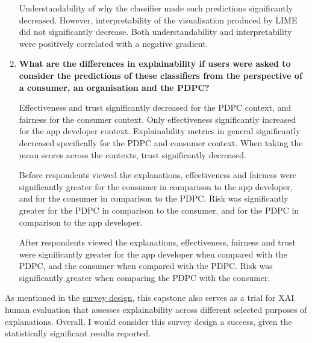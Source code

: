 \begin{enumerate}[listparindent=0.5cm]
    Understandability of why the classifier made such predictions significantly decreased. However, interpretability of the visualisation produced by LIME did not significantly decrease. Both understandability and interpretability were positively correlated with a negative gradient.

    \item \textbf{What are the differences in explainability if users were asked to consider the predictions of these classifiers from the perspective of a consumer, an organisation and the PDPC?}
    
    Effectiveness and trust significantly decreased for the PDPC context, and fairness for the consumer context. Only effectiveness significantly increased for the app developer context. Explainability metrics in general significantly decreased specifically for the PDPC and consumer context. When taking the mean scores across the contexts, trust significantly decreased. 

    Before respondents viewed the explanations, effectiveness and fairness were significantly greater for the consumer in comparison to the app developer, and for the consumer in comparison to the PDPC. Risk was significantly greater for the PDPC in comparison to the consumer, and for the PDPC in comparison to the app developer.

    After respondents viewed the explanations, effectiveness, fairness and trust were significantly greater for the app developer when compared with the PDPC, and the consumer when compared with the PDPC. Risk was significantly greater when comparing the PDPC with the consumer.
\end{enumerate}

As mentioned in the \hyperref[sec:survey_method]{survey design}, this capstone also serves as a trial for XAI human evaluation that assesses explainability across different selected purposes of explanations. Overall, I would consider this survey design a success, given the statistically significant results reported. 

